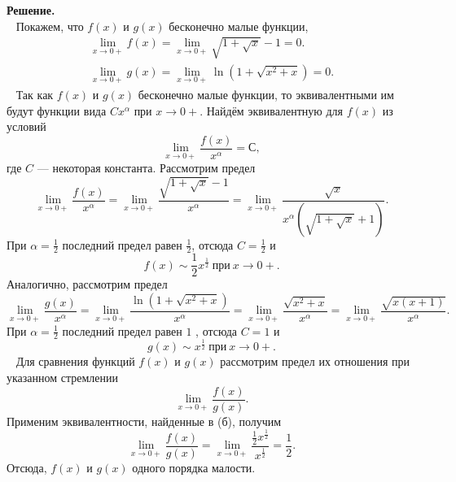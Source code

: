 \documentclass[12pt]{article}
\begin{document}
	{ \bf Решение. ~} \\
	 ~ Покажем, что $ f(x) $ и $ g(x) $ бесконечно малые функции,
	$$
	\begin{array} {cc}
	\lim \limits_ {x \rightarrow 0+ } f (x) = \lim \limits_ {x \rightarrow 0+ } \sqrt {1 + \sqrt {x}} - 1 = 0. \\
	\lim \limits_ {x \rightarrow 0+ } g (x) = \lim \limits_ {x \rightarrow 0+ } \ln(1 +\sqrt{ x^2 + x }) = 0.
	\end{array}
	$$	
	 ~ Так как $ f(x) $ и $ g(x) $ бесконечно малые функции, то эквивалентными им будут функции вида
	$ Cx ^ { \alpha } $ при $ x \rightarrow 0+ $. Найдём эквивалентную для $ f(x) $ из условий
	$$
	\lim\limits_ {x \rightarrow 0+ } \frac {f (x)} {x ^ { \alpha }} = С,
	$$
	где $ C $ --- некоторая константа. Рассмотрим предел
	$$
	\lim\limits_ {x \rightarrow 0+ } \frac {f (x)} {x ^ { \alpha }} =
	\lim\limits_ {x \rightarrow 0+ } \frac {\sqrt {1 + \sqrt {x}} - 1} { x ^ { \alpha }} =
	\lim\limits_ {x \rightarrow 0+ } \frac {\sqrt {x}} {x ^ { \alpha} (\sqrt {1 + \sqrt {x}} + 1)}.
	$$
	При $ \alpha = \frac {1}{2} $ последний предел равен $\frac{1}{2}$, отсюда $ C = \frac {1}{2} $ и
	$$
	f (x) \sim \frac{1}{2} x^ \frac{1}{2} ~ \text{при} ~ x \rightarrow 0+.
	$$
	Аналогично, рассмотрим предел
	$$
	\lim\limits_ {x \rightarrow 0+ } \frac {g(x)} {x ^ { \alpha }} =
	\lim\limits_ {x \rightarrow 0+ } \frac {\ln(1 +\sqrt{ x^2 + x })} {x ^ { \alpha }} =
	\lim\limits_ {x \rightarrow 0+ } \frac {\sqrt{ x^2 + x }} {x ^{ \alpha }} =
	\lim\limits_ {x \rightarrow 0+ } \frac {\sqrt {x (x + 1)}} {x ^ { \alpha}}.
	$$
	При $ \alpha = \frac{1}{2} $ последний предел равен $ 1 $ , отсюда $ C = 1 $ и
	$$
	g (x) \sim x^ \frac{1}{2} ~ \text{при} ~ x \rightarrow 0+.
	$$
	 ~ Для сравнения функций $ f(x) $ и $ g(x) $ рассмотрим предел их отношения при указанном стремлении
	$$
	\lim\limits _ {x \rightarrow 0+ } \frac {f(x)} {g(x)}.
	$$
	Применим эквивалентности, найденные в (б), получим
	$$
	\lim\limits_ {x \rightarrow 0+ } \frac {f(x)} {g(x)} =
	\lim\limits_ {x \rightarrow 0+ } \frac {\frac{1}{2} x^ \frac{1}{2}} {x^ \frac{1}{2}} = \frac{1}{2}.  
	$$
	Отсюда, $ f(x) $ и $ g(x) $ одного порядка малости.
\end{document}
